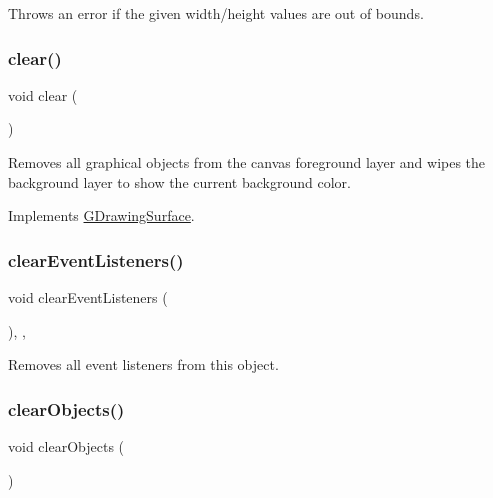 Throws an error if the given width/height values are out of bounds. 

\mbox{\label{classGCanvas_af220cadd1499c3586d48010a0348d9f8}} 
\subsubsection{\texorpdfstring{clear()}{clear()}}
{\footnotesize\ttfamily void clear (\begin{DoxyParamCaption}{ }\end{DoxyParamCaption})\hspace{0.3cm}{\ttfamily [virtual]}}



Removes all graphical objects from the canvas foreground layer and wipes the background layer to show the current background color. 



Implements \mbox{\hyperlink{classGDrawingSurface_a5eeb94d22b8366d1b68d0614384802fe}{G\+Drawing\+Surface}}.

\mbox{\label{classGObservable_a80cfa040459ff53594adbd6a51ec8f43}} 
\subsubsection{\texorpdfstring{clear\+Event\+Listeners()}{clearEventListeners()}}
{\footnotesize\ttfamily void clear\+Event\+Listeners (\begin{DoxyParamCaption}{ }\end{DoxyParamCaption})\hspace{0.3cm}{\ttfamily [protected]}, {\ttfamily [virtual]}, {\ttfamily [inherited]}}



Removes all event listeners from this object. 

\mbox{\label{classGCanvas_a6614e1320bc8e93b20df129613e5a0ff}} 
\subsubsection{\texorpdfstring{clear\+Objects()}{clearObjects()}}
{\footnotesize\ttfamily void clear\+Objects (\begin{DoxyParamCaption}{ }\end{DoxyParamCaption})\hspace{0.3cm}{\ttfamily [virtual]}}



